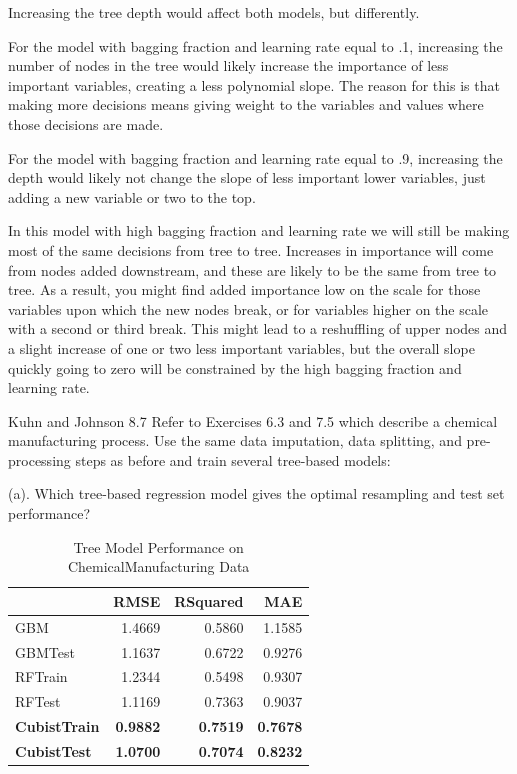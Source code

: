 \documentclass[]{report}
\begin{document}
Increasing the tree depth would affect both models, but differently.

For the model with bagging fraction and learning rate equal to .1,
increasing the number of nodes in the tree would likely increase the
importance of less important variables, creating a less polynomial
slope. The reason for this is that making more decisions means giving
weight to the variables and values where those decisions are made.

For the model with bagging fraction and learning rate equal to .9,
increasing the depth would likely not change the slope of less important
lower variables, just adding a new variable or two to the top.

In this model with high bagging fraction and learning rate we will still
be making most of the same decisions from tree to tree. Increases in
importance will come from nodes added downstream, and these are likely
to be the same from tree to tree. As a result, you might find added
importance low on the scale for those variables upon which the new nodes
break, or for variables higher on the scale with a second or third
break. This might lead to a reshuffling of upper nodes and a slight
increase of one or two less important variables, but the overall slope
quickly going to zero will be constrained by the high bagging fraction
and learning rate.


\begin{question}{Kuhn and Johnson 8.7}
Refer to Exercises 6.3 and 7.5 which describe a chemical manufacturing process. Use the same data imputation, data splitting, and pre-processing steps as before and train several tree-based models:
\end{question}

\begin{subquestion}{(a).} Which tree-based regression model gives the optimal resampling and test set performance? \end{subquestion}

\begin{table}[H]

\caption{\label{tab:unnamed-chunk-1}Tree Model Performance on ChemicalManufacturing Data}
\centering
\fontsize{8}{10}\selectfont
\begin{tabular}[t]{l|r|r|r}
\hline
\textbf{ } & \textbf{RMSE} & \textbf{RSquared} & \textbf{MAE}\\
\hline
\rowcolor{gray!6}  GBM & 1.4669 & 0.5860 & 1.1585\\
\hline
GBMTest & 1.1637 & 0.6722 & 0.9276\\
\hline
\rowcolor{gray!6}  RFTrain & 1.2344 & 0.5498 & 0.9307\\
\hline
RFTest & 1.1169 & 0.7363 & 0.9037\\
\hline
\rowcolor{gray!6}  \rowcolor[HTML]{d9f2e6}  \textbf{CubistTrain} & \textbf{0.9882} & \textbf{0.7519} & \textbf{0.7678}\\
\hline
\rowcolor[HTML]{d9f2e6}  \textbf{CubistTest} & \textbf{1.0700} & \textbf{0.7074} & \textbf{0.8232}\\
\hline
\end{tabular}
\end{table}
\end{document}
